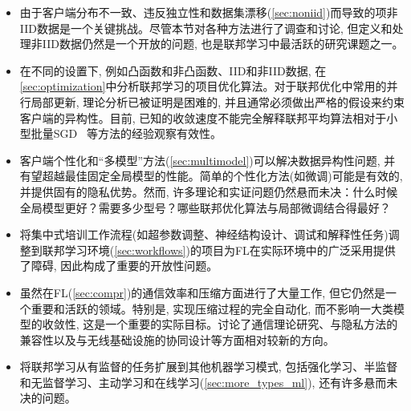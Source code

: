 \begin{itemize}
  \item 
 由于客户端分布不一致、违反独立性和数据集漂移(\cref{sec:noniid})而导致的项非IID数据是一个关键挑战。尽管本节对各种方法进行了调查和讨论, 但定义和处理非IID数据仍然是一个开放的问题, 也是联邦学习中最活跃的研究课题之一。
 \item 在不同的设置下, 例如凸函数和非凸函数、IID和非IID数据, 在\cref{sec:optimization}中分析联邦学习的项目优化算法。对于联邦优化中常用的并行局部更新, 理论分析已被证明是困难的, 并且通常必须做出严格的假设来约束客户端的异构性。目前, 已知的收敛速度不能完全解释联邦平均算法相对于小型批量SGD ~\citep{woodworth2020local}等方法的经验观察有效性。
 \item 客户端个性化和“多模型”方法(\cref{sec:multimodel})可以解决数据异构性问题, 并有望超越最佳固定全局模型的性能。简单的个性化方法(如微调)可能是有效的, 并提供固有的隐私优势。然而, 许多理论和实证问题仍然悬而未决：什么时候全局模型更好？需要多少型号？哪些联邦优化算法与局部微调结合得最好？
\item 将集中式培训工作流程(如超参数调整、神经结构设计、调试和解释性任务)调整到联邦学习环境(\cref{sec:workflows})的项目为FL在实际环境中的广泛采用提供了障碍, 因此构成了重要的开放性问题。
\item  虽然在FL(\cref{sec:compr})的通信效率和压缩方面进行了大量工作, 但它仍然是一个重要和活跃的领域。特别是, 实现压缩过程的完全自动化, 而不影响一大类模型的收敛性, 这是一个重要的实际目标。讨论了通信理论研究、与隐私方法的兼容性以及与无线基础设施的协同设计等方面相对较新的方向。
\item 将联邦学习从有监督的任务扩展到其他机器学习模式, 包括强化学习、半监督和无监督学习、主动学习和在线学习(\cref{sec:more_types_ml}), 还有许多悬而未决的问题。
\end{itemize}





 